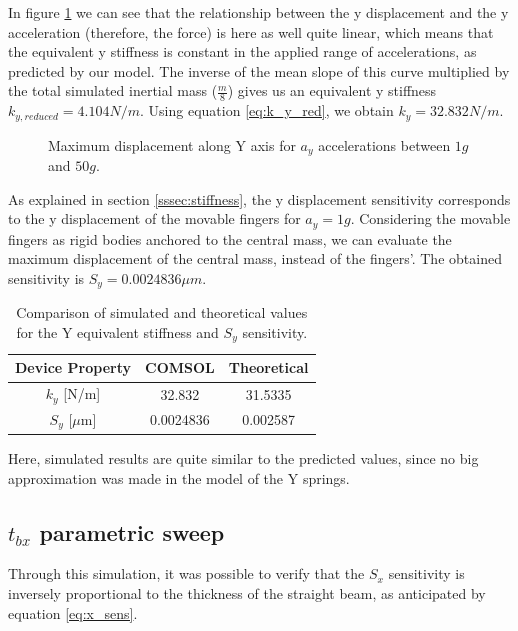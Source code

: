 \documentclass[lettersize,journal]{IEEEtran}
\begin{document}
    In figure \ref{plt:y_disp} we can see that the relationship between the y displacement and the y acceleration (therefore, the force) is here as well quite linear, which means that the equivalent y stiffness is constant in the applied range of accelerations, as predicted by our model. The inverse of the mean slope of this curve multiplied by the total simulated inertial mass (\(\frac{m}{8}\)) gives us an equivalent y stiffness \(k_{y,reduced}=4.104N/m\). Using equation \ref{eq:k_y_red}, we obtain \(k_y=32.832N/m\).    
    \begin{figure}[!h]
        \centering
        
        \caption{Maximum displacement along Y axis for \(a_y\) accelerations between \(1g\) and \(50g\).}
        \label{plt:y_disp}
    \end{figure}
    
    As explained in section \ref{sssec:stiffness}, the y displacement sensitivity corresponds to the y displacement of the movable fingers for \(a_y=1g\). Considering the movable fingers as rigid bodies anchored to the central mass, we can evaluate the maximum displacement of the central mass, instead of the fingers'. The obtained sensitivity is \(S_y=0.0024836\mu m\).
    
    \begin{table}[h]
        \caption{Comparison of simulated and theoretical values for the Y equivalent stiffness and \(S_y\) sensitivity.}
        \renewcommand{\arraystretch}{1.5}
        \centering
        \begin{tabular}{|c|c|c|}
            \hline
            \textbf{Device Property} & \textbf{COMSOL} & \textbf{Theoretical}\\ \hline
            \(k_y\) [N/m]       & 32.832   & 31.5335             \\ \hline
            \(S_y\) [\(\mu\)m]  & 0.0024836  & 0.002587              \\ \hline
        \end{tabular}
        \label{tab:ay_sweep_comparison}
    \end{table}
    
    Here, simulated results are quite similar to the predicted values, since no big approximation was made in the model of the Y springs.
    
    \bigskip
    \subsection{\(t_{bx}\) parametric sweep}\label{sse:tbx_sweep_study}
    Through this simulation, it was possible to verify that the \(S_x\) sensitivity is inversely proportional to the thickness of the straight beam, as anticipated by equation \ref{eq:x_sens}.
    
\end{document}
